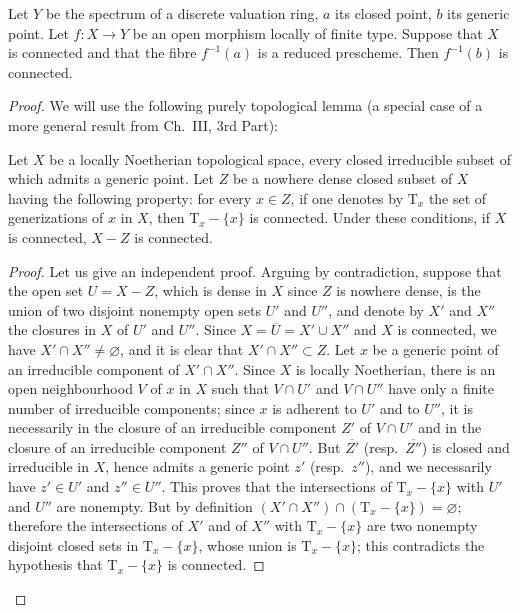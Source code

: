 \begin{lemma}[15.5.6]
\label{IV.15.5.6}
Let $Y$ be the spectrum of a discrete valuation ring, $a$ its closed point, $b$ its generic point.
Let $f:X\to Y$ be an open morphism locally of finite type.
Suppose that $X$ is connected and that the fibre $f^{-1}(a)$ is a reduced prescheme.
Then $f^{-1}(b)$ is connected.
\end{lemma}

\begin{proof}
We will use the following purely topological lemma (a special case of a more general result from Ch.\ III, 3rd Part):

\begin{lemma}[15.5.6.1]
\label{IV.15.5.6.1}
Let $X$ be a locally Noetherian topological space, every closed irreducible subset of which admits a generic point.
Let $Z$ be a nowhere dense closed subset of $X$ having the following property: for every $x\in Z$, if one denotes by $\mathrm{T}_x$ the set of generizations of $x$ in $X$, then $\mathrm{T}_x-\{x\}$ is connected.
Under these conditions, if $X$ is connected, $X-Z$ is connected.
\end{lemma}

\begin{proof}
Let us give an independent proof.
Arguing by contradiction, suppose that the open set $U=X-Z$, which is dense in $X$ since $Z$ is nowhere dense, is the union of two disjoint nonempty open sets $U'$ and $U''$, and denote by $X'$ and $X''$ the closures in $X$ of $U'$ and $U''$.
Since $X=\overline{U}=X'\cup X''$ and $X$ is connected, we have $X'\cap X''\neq\varnothing$, and it is clear that $X'\cap X''\subset Z$.
Let $x$ be a generic point of an irreducible component of $X'\cap X''$.
Since $X$ is locally Noetherian, there is an open neighbourhood $V$ of $x$ in $X$ such that $V\cap U'$ and $V\cap U''$ have only a finite number of irreducible components; since $x$ is adherent to $U'$ and to $U''$, it is necessarily in the closure of an irreducible component $Z'$ of $V\cap U'$ and in the closure of an irreducible component $Z''$ of $V\cap U''$.
But $\overline{Z'}$ (resp.\ $\overline{Z''}$) is closed and irreducible in $X$, hence admits a generic point $z'$ (resp.\ $z''$), and we necessarily have $z'\in U'$ and $z''\in U''$.
This proves that the intersections of $\mathrm{T}_x-\{x\}$ with $U'$ and $U''$ are nonempty.
But by definition $(X'\cap X'')\cap(\mathrm{T}_x-\{x\})=\varnothing$; therefore the intersections of $X'$ and of $X''$ with $\mathrm{T}_x-\{x\}$ are two nonempty disjoint closed sets in $\mathrm{T}_x-\{x\}$, whose union is $\mathrm{T}_x-\{x\}$; this contradicts the hypothesis that $\mathrm{T}_x-\{x\}$ is connected.
\end{proof}
\end{proof}

